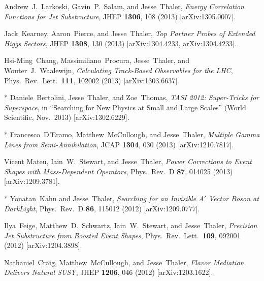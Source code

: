 \documentclass[11pt]{article}
\renewcommand{\bibitem}[1]{\item}
\begin{document}
\begin{list}{[]\addtocounter{jessecount}{-1}}{\leftmargin=3em \itemsep=4pt}
\bibitem{Larkoski:2013eya} 
  Andrew~J.~Larkoski, Gavin~P.~Salam, and Jesse~Thaler,
  \emph{Energy Correlation Functions for Jet Substructure},
  JHEP {\bf 1306}, 108 (2013)
  [arXiv:1305.0007].

\bibitem{Kearney:2013oia} 
  Jack~Kearney, Aaron~Pierce, and Jesse~Thaler,
  \emph{Top Partner Probes of Extended Higgs Sectors},
  JHEP {\bf 1308}, 130 (2013)
  [arXiv:1304.4233, arXiv:1304.4233].


\bibitem{Chang:2013rca} 
  Hsi-Ming~Chang, Massimiliano~Procura, Jesse~Thaler, and Wouter~J.~Waalewijn,
  \emph{Calculating Track-Based Observables for the LHC},
  Phys.\ Rev.\ Lett.\  {\bf 111}, 102002 (2013)
  [arXiv:1303.6637].


\bibitem{Bertolini:2013via} 
  * Daniele~Bertolini, Jesse~Thaler, and Zoe~Thomas,
  \emph{TASI 2012: Super-Tricks for Superspace},
  in ``Searching for New Physics at Small and Large Scales'' (World Scientific, Nov.\ 2013) 
  [arXiv:1302.6229].

\bibitem{D'Eramo:2012rr} 
  * Francesco~D'Eramo, Matthew~McCullough, and Jesse~Thaler,
  \emph{Multiple Gamma Lines from Semi-Annihilation},
  JCAP {\bf 1304}, 030 (2013)
  [arXiv:1210.7817].


\bibitem{Mateu:2012nk} 
  Vicent Mateu, Iain~W.~Stewart, and Jesse~Thaler,
  \emph{Power Corrections to Event Shapes with Mass-Dependent Operators},
  Phys.\ Rev.\ D {\bf 87}, 014025 (2013)
  [arXiv:1209.3781].
  

\bibitem{Kahn:2012br} 
  * Yonatan~Kahn and Jesse~Thaler,
  \emph{Searching for an Invisible $A'$ Vector Boson at DarkLight}, 
    Phys.\ Rev.\ D {\bf 86}, 115012 (2012)
  [arXiv:1209.0777].

\bibitem{Feige:2012vc} 
  Ilya~Feige, Matthew~D.~Schwartz, Iain~W.~Stewart, and Jesse~Thaler,
  \emph{Precision Jet Substructure from Boosted Event Shapes},
  Phys.\ Rev.\ Lett.\ {\bf 109}, 092001 (2012) [arXiv:1204.3898].

\bibitem{Craig:2012di} 
  Nathaniel~Craig, Matthew~McCullough, and Jesse~Thaler,
  \emph{Flavor Mediation Delivers Natural SUSY},
  JHEP {\bf 1206}, 046 (2012)
  [arXiv:1203.1622].


\end{list}
\end{document}
